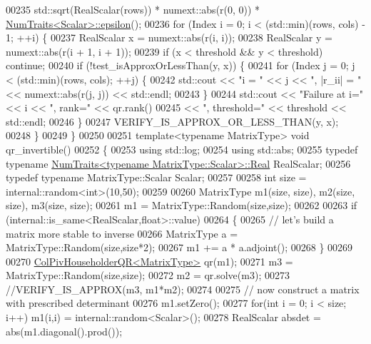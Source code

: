 \begin{DoxyCode}
00235       std::sqrt(RealScalar(rows)) * numext::abs(r(0, 0)) * 
      \hyperlink{group___core___module_struct_eigen_1_1_num_traits}{NumTraits<Scalar>::epsilon}();
00236   \textcolor{keywordflow}{for} (Index i = 0; i < (std::min)(rows, cols) - 1; ++i) \{
00237     RealScalar x = numext::abs(r(i, i));
00238     RealScalar y = numext::abs(r(i + 1, i + 1));
00239     \textcolor{keywordflow}{if} (x < threshold && y < threshold) \textcolor{keywordflow}{continue};
00240     \textcolor{keywordflow}{if} (!test\_isApproxOrLessThan(y, x)) \{
00241       \textcolor{keywordflow}{for} (Index j = 0; j < (std::min)(rows, cols); ++j) \{
00242         std::cout << \textcolor{stringliteral}{"i = "} << j << \textcolor{stringliteral}{", |r\_ii| = "} << numext::abs(r(j, j)) << std::endl;
00243       \}
00244       std::cout << \textcolor{stringliteral}{"Failure at i="} << i << \textcolor{stringliteral}{", rank="} << qr.rank()
00245                 << \textcolor{stringliteral}{", threshold="} << threshold << std::endl;
00246     \}
00247     VERIFY\_IS\_APPROX\_OR\_LESS\_THAN(y, x);
00248   \}
00249 \}
00250 
00251 \textcolor{keyword}{template}<\textcolor{keyword}{typename} MatrixType> \textcolor{keywordtype}{void} qr\_invertible()
00252 \{
00253   \textcolor{keyword}{using} std::log;
00254   \textcolor{keyword}{using} std::abs;
00255   \textcolor{keyword}{typedef} \textcolor{keyword}{typename} \hyperlink{group___core___module_struct_eigen_1_1_num_traits}{NumTraits<typename MatrixType::Scalar>::Real}
       RealScalar;
00256   \textcolor{keyword}{typedef} \textcolor{keyword}{typename} MatrixType::Scalar Scalar;
00257 
00258   \textcolor{keywordtype}{int} size = internal::random<int>(10,50);
00259 
00260   MatrixType m1(size, size), m2(size, size), m3(size, size);
00261   m1 = MatrixType::Random(size,size);
00262 
00263   \textcolor{keywordflow}{if} (internal::is\_same<RealScalar,float>::value)
00264   \{
00265     \textcolor{comment}{// let's build a matrix more stable to inverse}
00266     MatrixType a = MatrixType::Random(size,size*2);
00267     m1 += a * a.adjoint();
00268   \}
00269 
00270   \hyperlink{group___q_r___module}{ColPivHouseholderQR<MatrixType>} qr(m1);
00271   m3 = MatrixType::Random(size,size);
00272   m2 = qr.solve(m3);
00273   \textcolor{comment}{//VERIFY\_IS\_APPROX(m3, m1*m2);}
00274 
00275   \textcolor{comment}{// now construct a matrix with prescribed determinant}
00276   m1.setZero();
00277   \textcolor{keywordflow}{for}(\textcolor{keywordtype}{int} i = 0; i < size; i++) m1(i,i) = internal::random<Scalar>();
00278   RealScalar absdet = abs(m1.diagonal().prod());

\end{DoxyCode}
